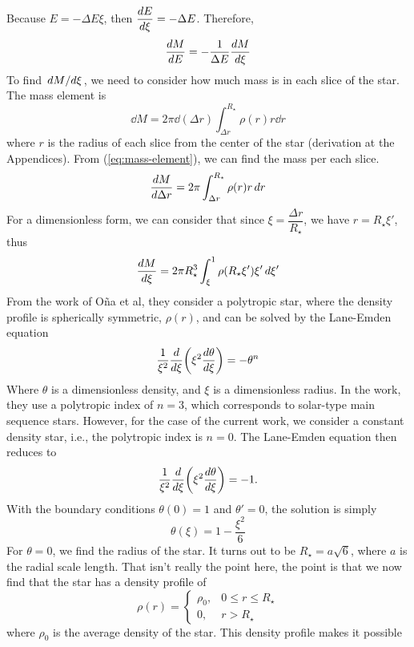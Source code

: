 \documentclass[10pt,a4paper]{article}
\begin{document}
		Because $E = -\Delta E \xi$, then $\displaystyle \dv{E}{\xi}= -\Delta E$. Therefore,
		\[
			\dv{M}{E} = -\frac{1}{\Delta E} \dv{M}{\xi}
		\]
		To find $\dv*{M}{\xi}$, we need to consider how much mass is in each slice of the star. The 
		mass element is
		\begin{equation}
			\label{eq:mass-element}
			\dd{M} = 2\pi \dd{(\Delta r)} \int_{\Delta r}^{R_\star} \rho(r) r \dd{r}
		\end{equation}
		where $r$ is the radius of each slice from the center of the star (derivation at the Appendices). From (\ref{eq:mass-element}), we 
		can find the mass per each slice.
		\[
			\dv{M}{\Delta r} = 2\pi  
			\int_{\Delta r}^{R_\star} \rho(r) r \dd{r}
		\]
		For a dimensionless form, we can consider that since $\xi = \dfrac{\Delta r}{R_\star}$, we have $r = R_\star \xi'$, thus
		\[
			\dv{M}{\xi} = 2\pi R_\star^3 \int_\xi^1 \rho(R_\star \xi') \xi' \dd{\xi'}
		\]
		From the work of O\~na et al, they consider a polytropic star, where the density profile
		is spherically symmetric, $\rho(r)$, and can be solved by the Lane-Emden equation\cite{Seidov2001}
		\begin{equation}
			\label{eq:lane-emden}
			\frac{1}{\xi^2} \dv{}{\xi}\pqty{
				\xi^2 \dv{\theta}{\xi} 
			} = - \theta^n
		\end{equation}
		Where $\theta$ is a dimensionless density, and $\xi$ is a dimensionless radius. 
		In the work, they use a polytropic index of $n=3$, which corresponds to solar-type main 
		sequence stars. However, for the case of the current work, we consider a constant density
		star, i.e., the polytropic index is $n=0$. The Lane-Emden equation then reduces to 
		\[
			\frac{1}{\xi^2} \dv{}{\xi}\pqty{
				\xi^2 \dv{\theta}{\xi} 
			} = -1 .
		\]
		With the boundary conditions $\theta(0)=1$ and $\theta'=0$, the solution is simply
		\[
			\theta(\xi) = 1 - \frac{\xi^2}{6} 
		\]	
		For $\theta = 0$, we find the radius of the star. It turns out to be $R_\star = a\sqrt{6}$, where $a$ is the radial scale length. That 
		isn't really the point here, the point is that we now find that the star has a
		density profile of
		\begin{equation}
			\label{eq:homogenous-density}
			\rho(r) = \begin{cases}
				\rho_0, & 0\leq r \leq R_\star\\
				0, & r > R_\star
			\end{cases}
		\end{equation}
		where $\rho_0$ is the average density of the star. This density profile makes it possible
\end{document}
